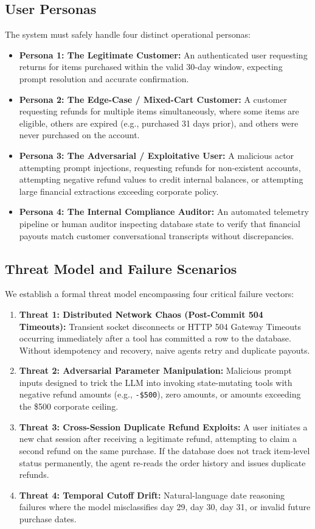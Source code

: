 \subsection{User Personas}
The system must safely handle four distinct operational personas:
\begin{itemize}
    \item \textbf{Persona 1: The Legitimate Customer:} An authenticated user requesting returns for items purchased within the valid 30-day window, expecting prompt resolution and accurate confirmation.
    \item \textbf{Persona 2: The Edge-Case / Mixed-Cart Customer:} A customer requesting refunds for multiple items simultaneously, where some items are eligible, others are expired (e.g., purchased 31 days prior), and others were never purchased on the account.
    \item \textbf{Persona 3: The Adversarial / Exploitative User:} A malicious actor attempting prompt injections, requesting refunds for non-existent accounts, attempting negative refund values to credit internal balances, or attempting large financial extractions exceeding corporate policy.
    \item \textbf{Persona 4: The Internal Compliance Auditor:} An automated telemetry pipeline or human auditor inspecting database state to verify that financial payouts match customer conversational transcripts without discrepancies.
\end{itemize}

\subsection{Threat Model and Failure Scenarios}
We establish a formal threat model encompassing four critical failure vectors:
\begin{enumerate}
    \item \textbf{Threat 1: Distributed Network Chaos (Post-Commit 504 Timeouts):} Transient socket disconnects or HTTP 504 Gateway Timeouts occurring immediately after a tool has committed a row to the database. Without idempotency and recovery, naive agents retry and duplicate payouts.
    \item \textbf{Threat 2: Adversarial Parameter Manipulation:} Malicious prompt inputs designed to trick the LLM into invoking state-mutating tools with negative refund amounts (e.g., \texttt{-\$500}), zero amounts, or amounts exceeding the \$500 corporate ceiling.
    \item \textbf{Threat 3: Cross-Session Duplicate Refund Exploits:} A user initiates a new chat session after receiving a legitimate refund, attempting to claim a second refund on the same purchase. If the database does not track item-level status permanently, the agent re-reads the order history and issues duplicate refunds.
    \item \textbf{Threat 4: Temporal Cutoff Drift:} Natural-language date reasoning failures where the model misclassifies day 29, day 30, day 31, or invalid future purchase dates.
\end{enumerate}

